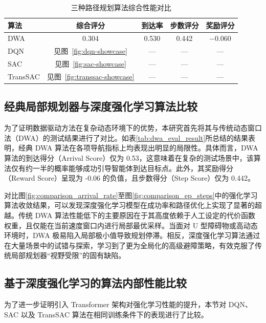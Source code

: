 \documentclass[
  oneside,
  degree=bachelor,
  fullwidthstop=false,
  fontset=fandol,
  times=false,
  minted=true,
  biblatex=true,
]{tongjithesis}
\begin{document}
\begin{table}[H]
    \centering
    \caption{三种路径规划算法综合性能对比}
    \label{tab:algo_comparison}
    \begin{tabular}{lcccc}
        \toprule
        \textbf{算法} & \textbf{综合评分} & \textbf{到达率} & \textbf{步数评分} & \textbf{奖励评分} \\
        \midrule
        DWA      & 0.304 & 0.530 & 0.442 & $-$0.060 \\
        DQN      & 见图~\ref{fig:dqn-showcase}     & —     & —     & — \\
        SAC      & 见图~\ref{fig:sac-showcase}     & —     & —     & — \\
        TransSAC & 见图~\ref{fig:transsac-showcase} & —     & —     & — \\
        \bottomrule
    \end{tabular}
\end{table}

\subsection{经典局部规划器与深度强化学习算法比较}

为了证明数据驱动方法在复杂动态环境下的优势，本研究首先将其与传统动态窗口法（DWA）的测试结果进行了对比。如表\ref{tab:dwa_eval_result}所总结的结果表明，经典 DWA 算法在各项导航指标上均表现出明显的局限性。具体而言，DWA 算法的到达得分（Arrival Score）仅为 0.53，这意味着在复杂的测试场景中，该算法仅有约一半的概率能够成功引导智能体到达目标点。此外，其奖励得分（Reward Score）呈现为 -0.06 的负值，且步数得分（Step Score）仅为 0.442。

对比图\ref{fig:comparison_arrival_rate}至图\ref{fig:comparison_ep_steps}中的强化学习算法收敛结果，可以发现深度强化学习模型在成功率和路径优化上实现了显著的超越。传统 DWA 算法性能低下的主要原因在于其高度依赖于人工设定的代价函数权重，且仅能在当前速度窗口内进行局部最优采样。当面对 U 型障碍物或高动态环境时，DWA 极易陷入局部极小值导致规划停滞。相反，深度强化学习算法通过在大量场景中的试错与探索，学习到了更为全局化的高级避障策略，有效克服了传统局部规划器“视野受限”的固有缺陷。

\subsection{基于深度强化学习的算法内部性能比较}

为了进一步证明引入 Transformer 架构对强化学习性能的提升，本节对 DQN、SAC 以及 TransSAC 算法在相同训练条件下的表现进行了比较。
\end{document}
